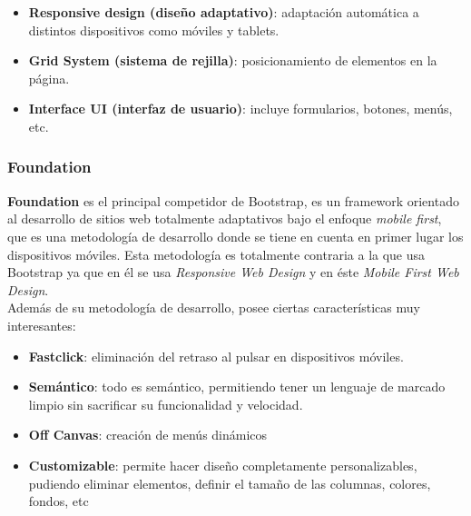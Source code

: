         
        \begin{itemize}
            \item \textbf{Responsive design (diseño adaptativo)}: adaptación automática a
            distintos dispositivos como móviles y tablets.
            \item \textbf{Grid System (sistema de rejilla)}: posicionamiento de elementos en
            la página.
            \item \textbf{Interface UI (interfaz de usuario)}: incluye formularios, botones,
            menús, etc.
        \end{itemize}
        
        \subsubsection{Foundation}
        \textbf{Foundation} \cite{foundation} es el principal competidor de Bootstrap, es
        un framework orientado al desarrollo de sitios web totalmente adaptativos bajo el
        enfoque \textit{mobile first}, que es una metodología de desarrollo donde se tiene
        en cuenta en primer lugar los dispositivos móviles. Esta metodología es totalmente
        contraria a la que usa Bootstrap ya que en él se usa \textit{Responsive Web Design}
        y en éste \textit{Mobile First Web Design}.\\
        
        Además de su metodología de desarrollo, posee ciertas características muy interesantes:
        
        \begin{itemize}
            \item \textbf{Fastclick}: eliminación del retraso al pulsar en dispositivos
            móviles.
            \item \textbf{Semántico}: todo es semántico, permitiendo tener un lenguaje de
            marcado limpio sin sacrificar su funcionalidad y velocidad.
            \item \textbf{Off Canvas}: creación de menús dinámicos
            \item \textbf{Customizable}: permite hacer diseño completamente personalizables,
            pudiendo eliminar elementos, definir el tamaño de las columnas, colores,
            fondos, etc
        \end{itemize}

